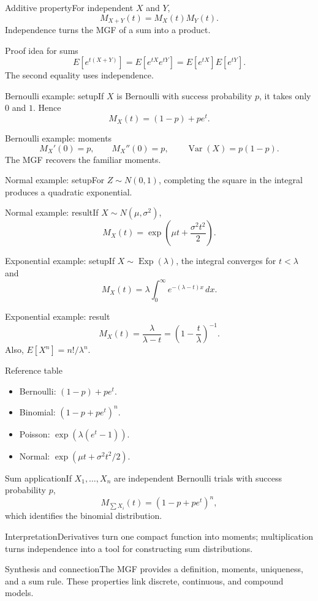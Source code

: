 \documentclass[10pt,aspectratio=169]{beamer}
\begin{document}
\begin{frame}{Additive property}\small For independent $X$ and $Y$,\[M_{X+Y}(t)=M_X(t)M_Y(t).\]Independence turns the MGF of a sum into a product.\end{frame}
\begin{frame}{Proof idea for sums}\small\[E[e^{t(X+Y)}]=E[e^{tX}e^{tY}]=E[e^{tX}]E[e^{tY}].\]The second equality uses independence.\end{frame}
\begin{frame}{Bernoulli example: setup}\small If $X$ is Bernoulli with success probability $p$, it takes only $0$ and $1$. Hence\[M_X(t)=(1-p)+pe^t.\]\end{frame}
\begin{frame}{Bernoulli example: moments}\small\[M_X'(0)=p,\qquad M_X''(0)=p,\qquad\operatorname{Var}(X)=p(1-p).\]The MGF recovers the familiar moments.\end{frame}
\begin{frame}{Normal example: setup}\small For $Z\sim N(0,1)$, completing the square in the integral produces a quadratic exponential.\end{frame}
\begin{frame}{Normal example: result}\small If $X\sim N(\mu,\sigma^2)$,\[M_X(t)=\exp\!\left(\mu t+\frac{\sigma^2t^2}{2}\right).\]\end{frame}
\begin{frame}{Exponential example: setup}\small If $X\sim\operatorname{Exp}(\lambda)$, the integral converges for $t<\lambda$ and\[M_X(t)=\lambda\int_0^\infty e^{-(\lambda-t)x}\,dx.\]\end{frame}
\begin{frame}{Exponential example: result}\small\[M_X(t)=\frac{\lambda}{\lambda-t}=\left(1-\frac t\lambda\right)^{-1}.\]Also, $E[X^n]=n!/\lambda^n$.\end{frame}
\begin{frame}{Reference table}\small\begin{itemize}\item Bernoulli: $(1-p)+pe^t$.\item Binomial: $(1-p+pe^t)^n$.\item Poisson: $\exp(\lambda(e^t-1))$.\item Normal: $\exp(\mu t+\sigma^2t^2/2)$.\end{itemize}\end{frame}
\begin{frame}{Sum application}\small If $X_1,\ldots,X_n$ are independent Bernoulli trials with success probability $p$,\[M_{\sum X_i}(t)=(1-p+pe^t)^n,\]which identifies the binomial distribution.\end{frame}
\begin{frame}{Interpretation}\small Derivatives turn one compact function into moments; multiplication turns independence into a tool for constructing sum distributions.\end{frame}
\begin{frame}{Synthesis and connection}\small The MGF provides a definition, moments, uniqueness, and a sum rule. These properties link discrete, continuous, and compound models.\end{frame}
\end{document}

